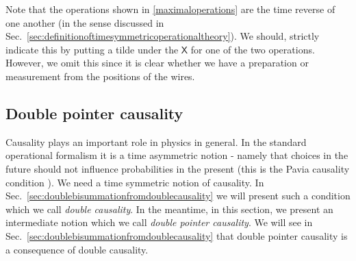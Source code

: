 \documentclass[10pt]{article}
\begin{document}
Note that the operations shown in \eqref{maximaloperations} are the time reverse of one another (in the sense discussed in Sec.\ \ref{sec:definitionoftimesymmetricoperationaltheory}).  We should, strictly indicate this by putting a tilde under the $\mathsf X$ for one of the two operations. However, we omit this since it is clear whether we have a preparation or measurement from the positions of the wires.


\subsection{Double pointer causality}

Causality plays an important role in physics in general.  In the standard operational formalism it is a time asymmetric notion - namely that choices in the future should not influence probabilities in the present (this is the Pavia causality condition \cite{chiribella2010informational}).  We need a time symmetric notion of causality.  In Sec.\ \ref{sec:doublebisummationfromdoublecausality} we will present such a condition which we call \emph{double causality}.  In the meantime, in this section, we present an intermediate notion which we call \emph{double pointer causality}.  We will see in Sec.\ \ref{sec:doublebisummationfromdoublecausality} that double pointer causality is a consequence of double causality.
\end{document}
